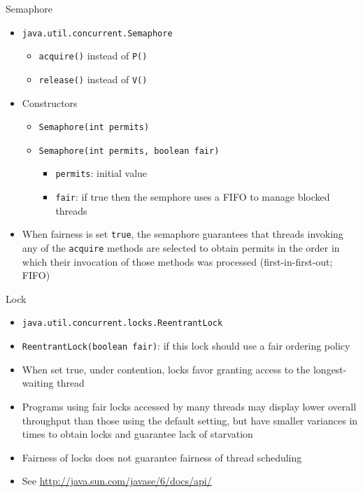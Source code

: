 \begin{frame}[fragile]{Semaphore}
  \begin{itemize}
  \item \lstinline!java.util.concurrent.Semaphore!
    \begin{itemize}
    \item \lstinline!acquire()! instead of \lstinline!P()!
    \item \lstinline!release()! instead of \lstinline!V()!
    \end{itemize}
  \item Constructors
    \begin{itemize}
    \item \lstinline!Semaphore(int permits)!
    \item \lstinline!Semaphore(int permits, boolean fair)!
      \begin{itemize}
      \item \lstinline!permits!: initial value
      \item \lstinline!fair!: if true then the semphore uses a FIFO to
        manage blocked threads
      \end{itemize}
    \end{itemize}
  \item When fairness is set \lstinline!true!, the semaphore
    guarantees that threads invoking any of the \lstinline!acquire!
    methods are selected to obtain permits in the order in which their
    invocation of those methods was processed (first-in-first-out;
    FIFO)
  \end{itemize}
\end{frame}

\begin{frame}[fragile]{Lock}
  \begin{itemize}
  \item \lstinline!java.util.concurrent.locks.ReentrantLock!
  \item \lstinline!ReentrantLock(boolean fair)!: if this lock should
    use a fair ordering policy
  \item When set true, under contention, locks favor granting access
    to the longest-waiting thread
  \item Programs using fair locks accessed by many threads may display
    lower overall throughput than those using the default setting, but
    have smaller variances in times to obtain locks and guarantee lack
    of starvation
  \item Fairness of locks does not guarantee fairness of thread
    scheduling
  \item See \url{http://java.sun.com/javase/6/docs/api/}
  \end{itemize}
\end{frame}

